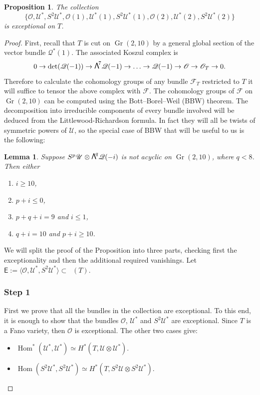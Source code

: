 \documentclass[JEP,XML,SOM,Unicode,NoEqCountersInSection]{cedram}
\newcommand\bw[1]{{\hbox{\large$\mathsf{\Lambda}$}^{\!#1}}}
\let\mathcal\mathscr
\theoremstyle{plain}
\newtheorem{prop}[theorem]{Proposition}
\newtheorem{lemma}[theorem]{Lemma}
\theoremstyle{definition}
\newcommand{\cat}[1]{\mathsf{#1}}
\newcommand{\sod}[1]{\langle #1 \rangle}
\DeclareMathOperator{\Db}{{\cat{D}^{\mathrm{b}}}}
\DeclareMathOperator{\Gr}{Gr}
\DeclareMathOperator{\Hom}{Hom}
\newcommand{\sheaf}[1]{\mathcal{#1}}
\newcommand{\ko}{\sheaf{O}}\let\OO\ko\let\cO\ko
\newcommand{\kq}{\sheaf{Q}}
\newcommand{\ku}{\sheaf{U}}
\begin{document}
\begin{prop}\label{prop:exc-coll-on-T}
The collection
\[
\{\ko,\ku^*,S^2\ku^*,\ko(1),\ku^*(1),S^2\ku^*(1),\ko(2),\ku^*(2),S^2\ku^*(2)\}
\]
is exceptional on $T$.
\end{prop}

\begin{proof}
First, recall that $T$ is cut on $\Gr(2,10)$ by a general global section of the vector bundle $\kq^*(1)$. The associated Koszul complex is \begin{equation*}\label{eqn:koszul}
0 \to \det(\kq(-1)) \to \bw7\kq(-1) \to \ldots \to \kq(-1) \to \OO \to \OO_T \to 0.
\end{equation*}
Therefore to calculate the cohomology groups of any bundle $\mathcal{F}_T$ restricted to $T$ it will suffice to tensor the above complex with $\mathcal{F}$. The cohomology groups of $\mathcal{F}$ on $\Gr(2,10)$ can be computed using the Bott--Borel--Weil (BBW) theorem. The decomposition into irreducible components of every bundle involved will be deduced from the Littlewood-Richardson formula. In fact they will all be twists of symmetric powers of $\ku$, so the special case of BBW that will be useful to us is the following:

\begin{lemma}\label{BBW}
Suppose $S^p\ku\otimes\bw{q}\kq (-i)$ is not acyclic on $\Gr(2,10)$, where $q<8$.
Then either
\begin{enumerate}
\item $i\ge 10$,
\item $p+i\le 0$,
\item $p+q+i=9$ and $i\le 1$,
\item $q+i=10$ and $p+i\ge 10$.
\end{enumerate}
\end{lemma}

We will split the proof of the Proposition into three parts,
checking first the exceptionality and then the additional required vanishings.
Let $\cat{E}:= \sod{\ko,\ku^*,S^2\ku^*} \subset \Db(T)$.

\subsubsection*{Step 1}
First we prove that all the bundles in the collection are exceptional. To this end, it is enough to show that
the bundles $\ko$, $\ku^*$ and $S^2\ku^*$ are exceptional. Since $T$ is a Fano variety, then
$\ko$ is exceptional. The other two cases give:
\begin{itemize}
\item $\Hom^*(\ku^*,\ku^*) \simeq H^*(T,\ku \otimes \ku^*)$.
\item $\Hom(S^2\ku^*,S^2\ku^*) \simeq H^*(T,S^2\ku \otimes S^2\ku^*)$.
\end{itemize}


\end{proof}
\end{document}
